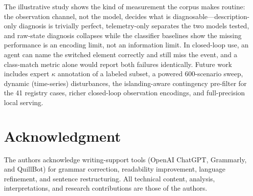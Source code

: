 \documentclass[conference]{IEEEtran}
\begin{document}
The illustrative study shows the kind of measurement the corpus makes routine: the observation channel, not the model, decides what is diagnosable---description-only diagnosis is trivially perfect, telemetry-only separates the two models tested, and raw-state diagnosis collapses while the classifier baselines show the missing performance is an encoding limit, not an information limit. In closed-loop use, an agent can name the switched element correctly and still miss the event, and a class-match metric alone would report both failures identically. Future work includes expert $\kappa$ annotation of a labeled subset, a powered 600-scenario sweep, dynamic (time-series) disturbances, the islanding-aware contingency pre-filter for the 41 registry cases, richer closed-loop observation encodings, and full-precision local serving.

\balance
\section*{Acknowledgment}
The authors acknowledge writing-support tools (OpenAI ChatGPT, Grammarly, and QuillBot) for grammar correction, readability improvement, language refinement, and sentence restructuring. All technical content, analysis, interpretations, and research contributions are those of the authors.
\end{document}
